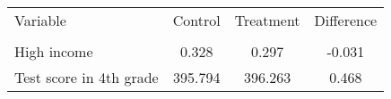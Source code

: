 \begin{tabular}{lccc} \toprule \toprule
Variable                    &       Control & Treatment & Difference \\
\addlinespace \hline \\
High income &  0.328 &  0.297 & -0.031\\
Test score in 4th grade & 395.794 & 396.263 &  0.468\\
\hline \hline
\end{tabular}
